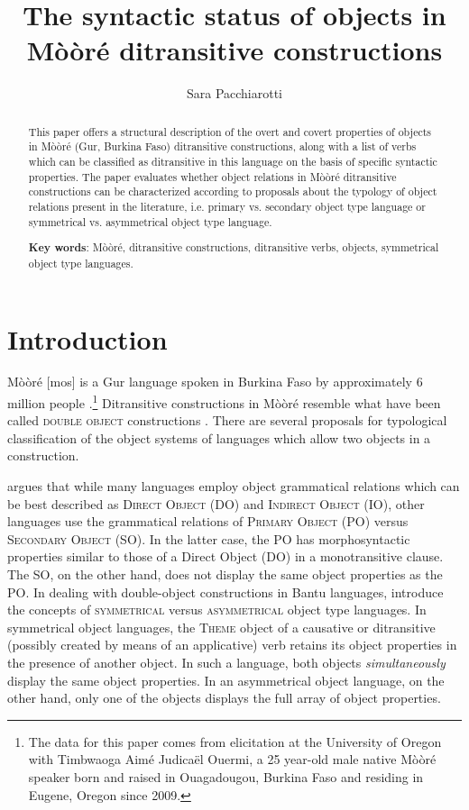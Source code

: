 \documentclass[output=paper]{langsci/langscibook}
\title{The syntactic status of objects in M\`{o}\`{o}r\'{e} ditransitive constructions}
\author{%
 Sara Pacchiarotti\affiliation{University of Oregon}
}
\begin{document}
\begin{abstract}
This paper offers a structural description of the overt and covert properties of objects in M\`{o}\`{o}r\'{e} (Gur, Burkina Faso) ditransitive constructions, along with a list of verbs which can be classified as ditransitive in this language on the basis of specific syntactic properties. The paper evaluates whether object relations in M\`{o}\`{o}r\'{e} ditransitive constructions can be characterized according to proposals about the typology of object relations present in the literature, i.e. primary vs. secondary object type language or symmetrical vs. asymmetrical object type language. 
\end{abstract}

\begin{abstract}
\textbf{Key words}: M\`{o}\`{o}r\'{e}, ditransitive constructions, ditransitive verbs, objects, symmetrical object type languages.  
\end{abstract}

\section{Introduction}\label{§1:introduction.pacchiarotti}

M\`{o}\`{o}r\'{e} [mos] is a Gur language spoken in Burkina Faso by approximately 6 million people \citep{lewisetal2016}.\footnote{The data for this paper comes from elicitation at the University of Oregon with Timbwaoga Aim\'{e} Judicaël Ouermi, a 25 year-old male native  M\`{o}\`{o}r\'{e} speaker born and raised in Ouagadougou, Burkina Faso and residing in Eugene, Oregon since 2009.} Ditransitive constructions in M\`{o}\`{o}r\'{e} resemble what have been called \textsc{double object} constructions \citep{dryer1986,dryer2007,goldberg1995}. There are several proposals for typological classification of the object systems of languages which allow two objects in a construction.

\citet{dryer1986} argues that while many languages employ object grammatical relations which can be best described as \textsc{Direct Object} (DO) and \textsc{Indirect Object} (IO), other languages use the grammatical relations of \textsc{Primary Object} (PO) versus \textsc{Secondary Object} (SO). In the latter case, the PO has morphosyntactic properties similar to those of a Direct Object (DO) in a monotransitive clause. The SO, on the other hand, does not display the same object properties as the PO. In dealing with double-object constructions in Bantu languages, \citet{bresnanmoshi1990} introduce the concepts of \textsc{symmetrical} versus \textsc{asymmetrical} object type languages. In symmetrical object languages, the \textsc{Theme} object of a causative or ditransitive (possibly created by means of an applicative) verb retains its object properties in the presence of another object. In such a language, both objects \textit{simultaneously }display the same object properties. In an asymmetrical object language, on the other hand, only one of the objects displays the full array of object properties. 
\end{document}
